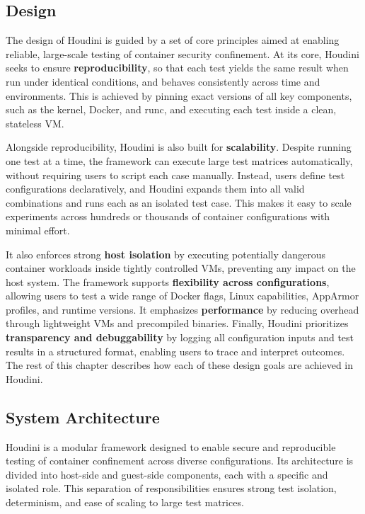 \documentclass[12pt]{report}
\begin{document}
\begin{doublespace}
\chapter{Design}

The design of Houdini is guided by a set of core principles aimed at enabling reliable, large-scale testing of container security confinement. At its core, Houdini seeks to ensure \textbf{reproducibility}, so that each test yields the same result when run under identical conditions, and behaves consistently across time and environments. This is achieved by pinning exact versions of all key components, such as the kernel, Docker, and runc, and executing each test inside a clean, stateless VM.

Alongside reproducibility, Houdini is also built for \textbf{scalability}. Despite running one test at a time, the framework can execute large test matrices automatically, without requiring users to script each case manually. Instead, users define test configurations declaratively, and Houdini expands them into all valid combinations and runs each as an isolated test case. This makes it easy to scale experiments across hundreds or thousands of container configurations with minimal effort.

It also enforces strong \textbf{host isolation} by executing potentially dangerous container workloads inside tightly controlled VMs, preventing any impact on the host system. The framework supports \textbf{flexibility across configurations}, allowing users to test a wide range of Docker flags, Linux capabilities, AppArmor profiles, and runtime versions. It emphasizes \textbf{performance} by reducing overhead through lightweight VMs and precompiled binaries. Finally, Houdini prioritizes \textbf{transparency and debuggability} by logging all configuration inputs and test results in a structured format, enabling users to trace and interpret outcomes. The rest of this chapter describes how each of these design goals are achieved in Houdini.



\section{System Architecture}
Houdini is a modular framework designed to enable secure and reproducible testing of container confinement across diverse configurations. Its architecture is divided into host-side and guest-side components, each with a specific and isolated role. This separation of responsibilities ensures strong test isolation, determinism, and ease of scaling to large test matrices.


\end{doublespace}
\end{document}
